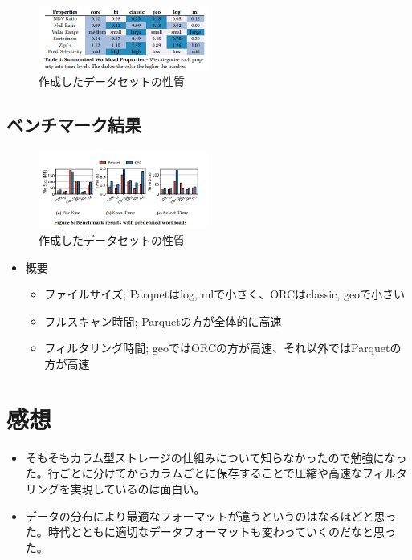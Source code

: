 \documentclass[uplatex]{jsarticle}
\theoremstyle{remark}
\begin{document}
\begin{figure}
  \centering
  \includegraphics[width=0.5\textwidth]{img/dataset-workload.png}
  \caption{作成したデータセットの性質}
  \label{fig:dataset-workload}
\end{figure}

\subsection{ベンチマーク結果}

\begin{figure}
  \centering
  \includegraphics[width=0.5\textwidth]{img/columnar-storage-format-result1.png}
  \caption{作成したデータセットの性質}
  \label{fig:result1}
\end{figure}

\begin{itemize}
  \item 概要
  \begin{itemize}
    \item ファイルサイズ; Parquetはlog, mlで小さく、ORCはclassic, geoで小さい
    \item フルスキャン時間; Parquetの方が全体的に高速
    \item フィルタリング時間; geoではORCの方が高速、それ以外ではParquetの方が高速
  \end{itemize}
\end{itemize}

\section{感想}
\begin{itemize}
  \item そもそもカラム型ストレージの仕組みについて知らなかったので勉強になった。行ごとに分けてからカラムごとに保存することで圧縮や高速なフィルタリングを実現しているのは面白い。
  \item データの分布により最適なフォーマットが違うというのはなるほどと思った。時代とともに適切なデータフォーマットも変わっていくのだなと思った。
\end{itemize}




\end{document}
